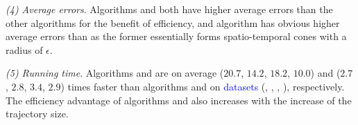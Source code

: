 \sstab\emph{(4) Average errors}. {Algorithms \cist and \cista both have higher average errors than the other algorithms for the benefit of efficiency, and algorithm \cista has obvious higher average errors than \cist as the former essentially forms spatio-temporal cones with a radius of $\epsilon$.}

\sstab\emph{(5) Running time}. Algorithms \cist and \cista are on average ($20.7$, $14.2$, $18.2$, $10.0$) and ($2.7$, $2.8$, $3.4$, {$2.9$}) times faster than algorithms \dps and \squishe on \textcolor{blue}{datasets} (\truck, \sercar, {\geolife}, \pricar), respectively. The efficiency advantage of algorithms \cist and \cista also increases  with the increase of the trajectory size.






